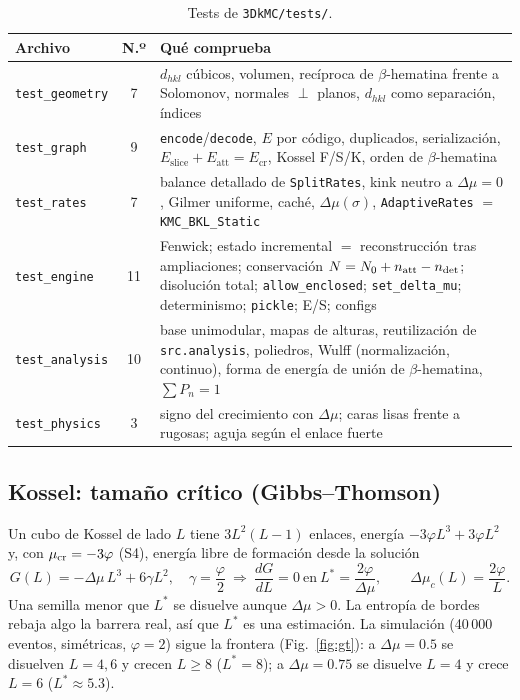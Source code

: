 \documentclass[11pt,a4paper]{article}
\newcommand{\code}[1]{\texttt{#1}}
\newcommand{\Ecr}{E_{\mathrm{cr}}}
\newcommand{\Eslice}{E_{\mathrm{slice}}}
\newcommand{\Eatt}{E_{\mathrm{att}}}
\newcommand{\dmu}{\Delta\mu}
\newcommand{\bh}{$\beta$-hematina}
\begin{document}
\begin{table}[h]
\centering\small
\caption{Tests de \code{3DkMC/tests/}.}
\label{tab:tests}
\begin{tabularx}{\linewidth}{@{}lcY@{}}
\toprule
Archivo & N.º & Qué comprueba\\
\midrule
\code{test\_geometry} & 7 & $d_{hkl}$ cúbicos, volumen, recíproca de \bh{} frente a Solomonov, normales $\perp$ planos, $d_{hkl}$ como separación, índices\\
\code{test\_graph} & 9 & \code{encode}/\code{decode}, $E$ por código, duplicados, serialización, $\Eslice+\Eatt=\Ecr$, Kossel F/S/K, orden de \bh{}\\
\code{test\_rates} & 7 & balance detallado de \code{SplitRates}, kink neutro a $\dmu=0$, Gilmer uniforme, caché, $\dmu(\sigma)$, \code{AdaptiveRates} $=$ \code{KMC\_BKL\_Static}\\
\code{test\_engine} & 11 & Fenwick; estado incremental $=$ reconstrucción tras ampliaciones; conservación $N=N_0+n_{\rm att}-n_{\rm det}$; disolución total; \code{allow\_enclosed}; \code{set\_delta\_mu}; determinismo; \code{pickle}; E/S; configs\\
\code{test\_analysis} & 10 & base unimodular, mapas de alturas, reutilización de \code{src.analysis}, poliedros, Wulff (normalización, continuo), forma de energía de unión de \bh{}, $\sum P_n=1$\\
\code{test\_physics} & 3 & signo del crecimiento con $\dmu$; caras lisas frente a rugosas; aguja según el enlace fuerte\\
\bottomrule
\end{tabularx}
\end{table}

\subsection{Kossel: tamaño crítico (Gibbs--Thomson)}

Un cubo de Kossel de lado $L$ tiene $3L^2(L-1)$ enlaces, energía $-3\varphi L^3+3\varphi L^2$ y, con
$\mu_{\rm cr}=-3\varphi$ (S4), energía libre de formación desde la solución
\begin{equation}
G(L)=-\dmu\,L^3+6\gamma L^2,\quad\gamma=\frac{\varphi}{2}\ \Longrightarrow\
\frac{dG}{dL}=0\ \text{en}\ L^*=\frac{2\varphi}{\dmu},\qquad \dmu_c(L)=\frac{2\varphi}{L}.
\label{eq:GT}
\end{equation}
Una semilla menor que $L^*$ se disuelve aunque $\dmu>0$. La entropía de bordes rebaja algo la barrera
real, así que $L^*$ es una estimación. La simulación (40\,000 eventos, simétricas, $\varphi=2$) sigue
la frontera (Fig.~\ref{fig:gt}): a $\dmu=0.5$ se disuelven $L=4,6$ y crecen $L\ge8$ ($L^*=8$); a
$\dmu=0.75$ se disuelve $L=4$ y crece $L=6$ ($L^*\approx5.3$).
\end{document}
